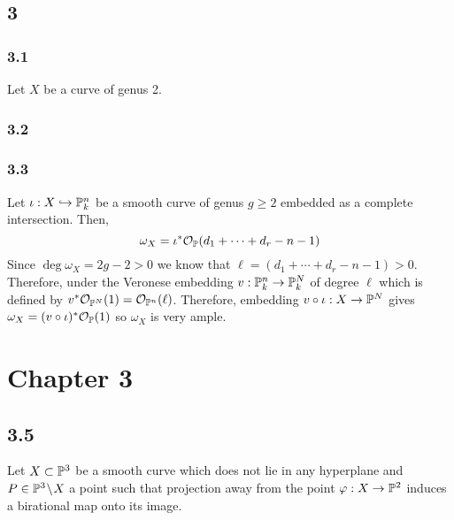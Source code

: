 \documentclass[12pt]{article}
\begin{document}
\subsection{3}

\subsubsection{3.1}

Let $X$ be a curve of genus 2.

\subsubsection{3.2}

\subsubsection{3.3}

Let $\iota : X \embed \P^n_k$ be a smooth curve of genus $g \ge 2$ embedded as a complete intersection. Then,
\[ \omega_X = \iota^* \struct{\P}(d_1 + \cdots + d_r - n - 1) \]
Since $\deg{\omega_X} = 2 g - 2 > 0$ we know that $\ell = (d_1 + \cdots + d_r - n - 1) > 0$. Therefore, under the Veronese embedding $v : \P^n_k \to \P^N_k$ of degree $\ell$ which is defined by $v^* \struct{\P^{N}}(1) = \struct{\P^n}(\ell)$. Therefore, embedding $v \circ \iota : X \to \P^N$ gives $\omega_X = (v \circ \iota)^* \struct{\P}(1)$ so $\omega_X$ is very ample. 

\section{Chapter 3}

\subsection{3.5}

Let $X \subset \P^3$ be a smooth curve which does not lie in any hyperplane and $P \in \P^3 \sm X$ a point such that projection away from the point $\varphi : X \to \P^2$ induces a birational map onto its image. 
\end{document}
